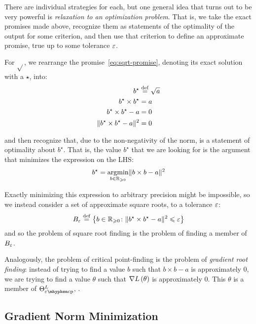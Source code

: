 \documentclass[../../thesis.tex]{subfiles}
\begin{document}
There are individual strategies for each,
but one general idea that turns out to be very powerful is
\emph{relaxation to an optimization problem}.
That is, we take the exact promises made above,
recognize them as statements of the optimality of the output for some criterion,
and then use that criterion to define an approximate promise,
true up to some tolerance $\varepsilon$.

For $\sqrt{}$, we rearrange the promise~\ref{eq:sqrt-promise},
denoting its exact solution with a $\star$, into:
\begin{align}
    b^\star &\defeq \sqrt{a} \\
    b^\star \times b^\star &= a  \\
    b^\star \times b^\star - a &= 0  \\
    \snorm{b^\star \times b^\star - a} &=0\equationlabel{sqrt-opt-criter}
\end{align}

\noindent and then recognize that, due to the non-negativity of the norm,
 is a statement of optimality about $b^\star$.
That is,
the value $b^\star$ that we are looking for is the
argument that minimizes the expression on the LHS:\@
\begin{equation}
	b^\star = \mathop{\mathrm{argmin}}_{b \in \mathbb{R}_{\geqslant 0}} \lVert b \times b - a\rVert^2
\end{equation}

Exactly minimizing this expression to arbitrary precision
might be impossible,
so we instead consider a set of approximate square roots,
to a tolerance $\varepsilon$:
\begin{equation}
	B_\varepsilon \stackrel{\small \mathrm{def}}{=}
	\left\{b \in \mathbb{R}_{\geqslant 0} \colon \lVert b^\star \times b^\star - a\rVert^2 \leqslant \varepsilon \right\}
\end{equation}
\noindent and so the problem of square root finding
is the problem of finding a member of $B_\varepsilon$.

Analogously, the problem of critical point-finding
is the problem of \emph{gradient root finding}:
instead of trying to find a value $b$ such that
$b\times b - a$
is approximately $0$,
we are trying to find a value $\theta$ such that
$\nabla L\left(\theta\right)$
is approximately $0$.
This $\theta$ is a member of $\Theta^L_{\ecp}$,
.

\subsection{Gradient Norm Minimization}
\end{document}
